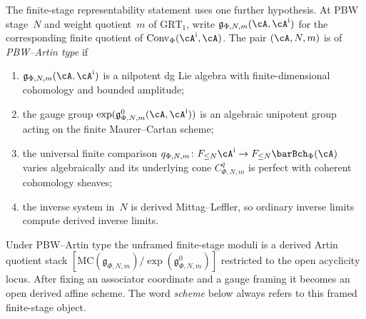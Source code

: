 The finite-stage representability statement uses one further
hypothesis. At PBW stage~$N$ and weight quotient~$m$ of
$\mathrm{GRT}_1$, write
$\mathfrak g_{\Phi,N,m}(\cA,\cA^{\mathrm i})$ for the corresponding
finite quotient of
$\mathrm{Conv}_\Phi(\cA^{\mathrm i},\cA)$. The pair
$(\cA,N,m)$ is of \emph{PBW--Artin type} if
\begin{enumerate}[label=\textup{(\alph*)}]
\item $\mathfrak g_{\Phi,N,m}(\cA,\cA^{\mathrm i})$ is a nilpotent dg Lie
 algebra with finite-dimensional cohomology and bounded
 amplitude;
\item the gauge group
 $\exp(\mathfrak g_{\Phi,N,m}^0(\cA,\cA^{\mathrm i}))$ is an algebraic
 unipotent group acting on the finite Maurer--Cartan scheme;
\item the universal finite comparison
 $q_{\Phi,N,m}\colon F_{\le N}\cA^{\mathrm i}\to
 F_{\le N}\barBch_\Phi(\cA)$ varies algebraically and its
 underlying cone $C^q_{\Phi,N,m}$ is perfect with coherent
 cohomology sheaves;
\item the inverse system in~$N$ is derived Mittag--Leffler, so
 ordinary inverse limits compute derived inverse limits.
\end{enumerate}
Under PBW--Artin type the unframed finite-stage moduli is a
derived Artin quotient stack
$[\mathrm{MC}(\mathfrak g_{\Phi,N,m})/\exp(\mathfrak g_{\Phi,N,m}^0)]$
restricted to the open acyclicity locus. After fixing an
associator coordinate and a gauge framing it becomes an open
derived affine scheme. The word \emph{scheme} below always refers
to this framed finite-stage object.


